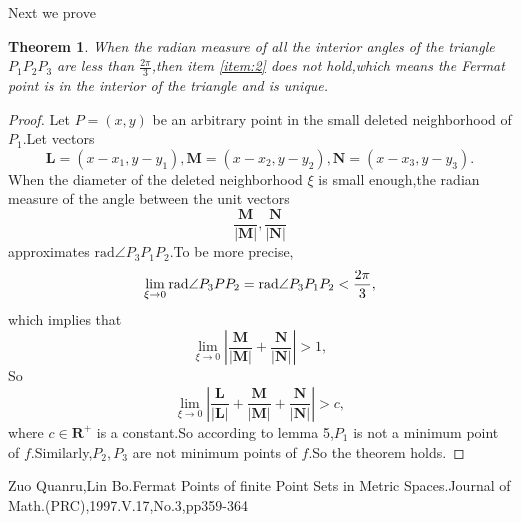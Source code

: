 \documentclass{amsart}
\theoremstyle{plain}
\newtheorem{theorem}{Theorem}
\theoremstyle{definition}
\begin{document}
Next we prove
\begin{theorem}
  When the radian  measure of all the interior angles of the triangle
$P_1P_2P_3$ are less than $\frac{2\pi}{3}$,then item
\eqref{item:2} does not hold,which means the Fermat point is in the
interior of the triangle and is unique.
\end{theorem}
\begin{proof}

Let  $P=(x,y)$ be an arbitrary point in the small
deleted neighborhood of $P_1$.Let vectors
$$
\mathbf{L}=(x-x_1,y-y_1),\mathbf{M}=(x-x_2,y-y_2),\mathbf{N}=(x-x_3,y-y_3).
$$
When the diameter of the deleted neighborhood $\xi$ is small
enough,the radian measure of the
angle between the unit vectors
$$
\frac{\mathbf{M}}{|\mathbf{M}|},\frac{\mathbf{N}}{|\mathbf{N}|}
$$
approximates $\mbox{rad}\angle P_3P_1P_2$.To be more precise,
$$
\lim_{\xi\to 0} \hbox{rad}\angle P_3PP_2=\hbox{rad}\angle P_3P_1P_2< \frac{2\pi}{3},
$$
which implies that
$$
\lim_{\xi\to 0}\left|\frac{\mathbf{M}}{|\mathbf{M}|}+\frac{\mathbf{N}}{|\mathbf{N}|}\right|>1,
$$
So
$$
\lim_{\xi\to
  0}\left|\frac{\mathbf{L}}{|\mathbf{L}|}+\frac{\mathbf{M}}{|\mathbf{M}|}+\frac{\mathbf{N}}{|\mathbf{N}|}\right|>c,
$$
where $c\in \mathbf{R}^{+}$ is a constant.So according to lemma
5,$P_1$ is not a minimum point of $f$.Similarly,$P_2,P_3$ are not 
minimum points of $f$.So the theorem holds.
\end{proof}


\begin{thebibliography}{1}

Zuo Quanru,Lin Bo.Fermat Points of finite Point Sets in
  Metric Spaces.Journal of Math.(PRC),1997.V.17,No.3,pp359-364


\end{thebibliography}
\end{document}
